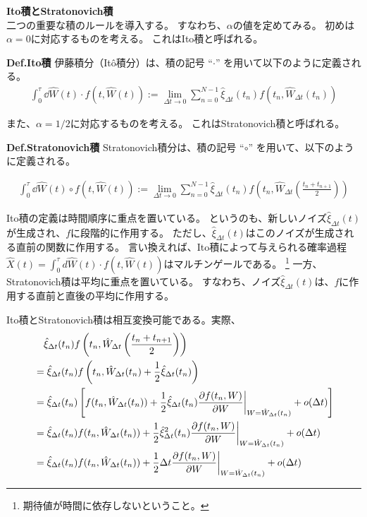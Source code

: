 \documentclass[a4paper,11pt]{jsarticle}
\numberwithin{equation}{section}
\begin{document}
\textbf{Ito積とStratonovich積}\\
二つの重要な積のルールを導入する。
すなわち、$\alpha$の値を定めてみる。
初めは$\alpha = 0$に対応するものを考える。
これはIto積と呼ばれる。
\begin{itembox}[l]{\textbf{Def.Ito積}}
    伊藤積分（Itô積分）は、積の記号 “\(\cdot\)” を用いて以下のように定義される。
    \begin{align}
    \int_0^\tau \dd{\hat{W}(t)} \cdot f(t, \hat{W}(t)) := \lim_{\Delta t \to 0} \sum_{n=0}^{N-1} \hat{\xi}_{\Delta t}(t_n) f(t_n, \hat{W}_{\Delta t}(t_n))
    \end{align}
    \end{itembox}
    また、$\alpha =1/2$に対応するものを考える。
    これはStratonovich積と呼ばれる。
    \begin{itembox}[l]{\textbf{Def.Stratonovich積}}
      Stratonovich積分は、積の記号 “\(\circ\)” を用いて、以下のように定義される。

    \begin{align}
    \int_0^\tau \dd{\hat{W}(t)} \circ f(t, \hat{W}(t)) := \lim_{\Delta t \to 0} \sum_{n=0}^{N-1} \hat{\xi}_{\Delta t}(t_n) f\left( t_n, \hat{W}_{\Delta t} \left( \frac{t_n + t_{n+1}}{2} \right) \right)
    \end{align}
    \end{itembox}
Ito積の定義は時間順序に重点を置いている。
というのも、新しいノイズ$\hat{\xi}_{\Delta t}(t)$が生成され、$f$に段階的に作用する。
ただし、$\hat{\xi}_{\Delta t}(t)$はこのノイズが生成される直前の関数に作用する。
言い換えれば、Ito積によって与えられる確率過程$\hat{X}(t) = \int_{0}^{\tau} d\hat{W}(t) \cdot f(t, \hat{W}(t))$はマルチンゲールである。
\footnote{期待値が時間に依存しないということ。}
一方、Stratonovich積は平均に重点を置いている。
すなわち、ノイズ$\hat{\xi}_{\Delta t}(t)$は、$f$に作用する直前と直後の平均に作用する。

Ito積とStratonovich積は相互変換可能である。実際、
\begin{align}
&\quad \hat{\xi}_{\Delta t}(t_n) f\left( t_n, \hat{W}_{\Delta t} \left( \frac{t_n + t_{n+1}}{2} \right) \right)\\
&= \hat{\xi}_{\Delta t}(t_n) f\left( t_n, \hat{W}_{\Delta t}(t_n) + \frac{1}{2} \hat{\xi}_{\Delta t}(t_n) \right) \\
&= \hat{\xi}_{\Delta t}(t_n) \left[ f(t_n, \hat{W}_{\Delta t}(t_n)) + \frac{1}{2} \hat{\xi}_{\Delta t}(t_n) \pdv{f(t_n, W)}{W} \biggr|_{W = \hat{W}_{\Delta t}(t_n)} + o(\Delta t) \right] \\
&= \hat{\xi}_{\Delta t}(t_n) f(t_n, \hat{W}_{\Delta t}(t_n)) + \frac{1}{2} \hat{\xi}_{\Delta t}^2(t_n) \pdv{f(t_n, W)}{W} \biggr|_{W = \hat{W}_{\Delta t}(t_n)} + o(\Delta t) \\
&= \hat{\xi}_{\Delta t}(t_n) f(t_n, \hat{W}_{\Delta t}(t_n)) + \frac{1}{2} \Delta t \pdv{f(t_n, W)}{W} \biggr|_{W = \hat{W}_{\Delta t}(t_n)} + o(\Delta t)
\end{align}
\end{document}
